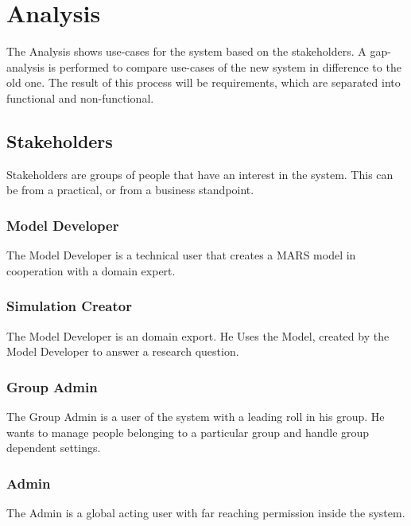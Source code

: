 
\chapter{Analysis}
The Analysis shows use-cases for the system based on the stakeholders. A gap-analysis is performed to compare use-cases of the new system in difference to the old one. The result of this process will be requirements, which are separated into functional and non-functional.


\section{Stakeholders}
Stakeholders are groups of people that have an interest in the system. This can be from a practical, or from a business standpoint. 

\subsection{Model Developer}
The Model Developer is a technical user that creates a MARS model in cooperation with a domain expert.

\subsection{Simulation Creator}
The Model Developer is an domain export. He Uses the Model, created by the Model Developer to answer a research question.

\subsection{Group Admin}
The Group Admin is a user of the system with a leading roll in his group. He wants to manage people belonging to a particular group and handle group dependent settings.

\subsection{Admin}
The Admin is a global acting user with far reaching permission inside the system.


